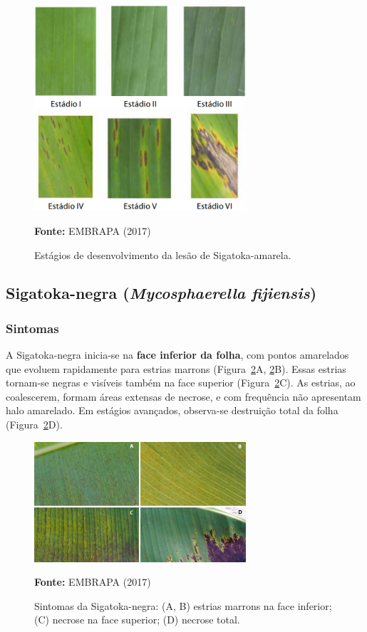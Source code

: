 \begin{figure}[h]
    \centering
    \includegraphics[width=0.7\textwidth]{figuras/capitulo 3/amarela_estagios.png}
    \caption{Estágios de desenvolvimento da lesão de Sigatoka-amarela.}
    \label{fig:sigatoka_amarela_estagios}
    \small{\textbf{Fonte:} EMBRAPA (2017)}
\end{figure}

\subsection{Sigatoka-negra (\textit{Mycosphaerella fijiensis})}

\subsubsection*{Sintomas}

A Sigatoka-negra inicia-se na \textbf{face inferior da folha}, com pontos amarelados que evoluem rapidamente para estrias marrons (Figura~\ref{fig:sigatoka_negra}A, \ref{fig:sigatoka_negra}B). Essas estrias tornam-se negras e visíveis também na face superior (Figura~\ref{fig:sigatoka_negra}C). As estrias, ao coalescerem, formam áreas extensas de necrose, e com frequência não apresentam halo amarelado. Em estágios avançados, observa-se destruição total da folha (Figura~\ref{fig:sigatoka_negra}D).

\begin{figure}[h]
    \centering
    \includegraphics[width=0.7\textwidth]{figuras/capitulo 3/negra.png}
    \caption{Sintomas da Sigatoka-negra: (A, B) estrias marrons na face inferior; (C) necrose na face superior; (D) necrose total.}
    \label{fig:sigatoka_negra}
    \small{\textbf{Fonte:} EMBRAPA (2017)}
\end{figure}

